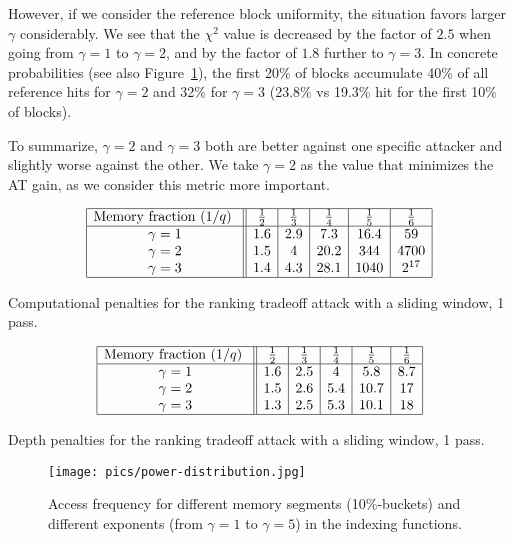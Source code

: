 \documentclass[a4paper]{article}
\begin{document}
However, if we consider the reference block uniformity, the situation favors larger $\gamma$ considerably. We see that the $\chi^2$ value is decreased by the factor of $2.5$ when going from $\gamma=1$ to $\gamma=2$, and by the factor of $1.8$ further to $\gamma=3$. In concrete probabilities (see also Figure~\ref{fig:histo}),
the first 20\% of blocks accumulate 40\% of all reference hits for $\gamma=2$ and 32\% for $\gamma=3$ (23.8\% vs  19.3\% hit for the first 10\% of blocks). 

To summarize, $\gamma=2$ and $\gamma=3$ both are better against one specific attacker and slightly worse against the other. We take $\gamma=2$ as the value that minimizes the AT gain, as we consider this metric more important. 

 \begin{table}[ht]
\renewcommand{\arraystretch}{1.3}
$$
\begin{array}{|c||c|c|c|c|c|}
\hline
\text{Memory fraction ($1/q$) } &\frac{1}{2} &\frac{1}{3} &\frac{1}{4}&\frac{1}{5} &\frac{1}{6}\\
\hline
\gamma=1 & 1.6 & 2.9 & 7.3 & 16.4 & 59\\
\gamma=2 & 1.5 & 4 & 20.2 & 344 & 4700\\
\gamma=3 &1.4& 4.3& 28.1 &1040 & 2^{17}\\
\hline
\end{array}
$$
\caption{Computational penalties for the ranking tradeoff attack with a sliding window, 1 pass.}\label{tab:comp-alpha}
\end{table}

 \begin{table}[ht]
\renewcommand{\arraystretch}{1.3}
$$
\begin{array}{|c||c|c|c|c|c|}
\hline
\text{Memory fraction ($1/q$) } &\frac{1}{2} &\frac{1}{3} &\frac{1}{4}&\frac{1}{5} &\frac{1}{6}\\
\hline
\gamma=1 & 1.6 & 2.5 & 4 & 5.8 & 8.7\\
\gamma=2 & 1.5 & 2.6 & 5.4 & 10.7 & 17\\
\gamma=3 &1.3& 2.5& 5.3 &10.1 & 18\\
\hline
\end{array}
$$
\caption{Depth penalties for the ranking tradeoff attack with a sliding window, 1 pass.}\label{tab:depth-alpha}
\end{table}

\begin{figure}[hb]
\begin{center}
\texttt{[image: pics/power-distribution.jpg]}
\end{center}
\caption{Access frequency for different memory segments (10\%-buckets) and different exponents (from $\gamma=1$ to $\gamma=5$) in the indexing functions.}\label{fig:histo}
\end{figure}
\end{document}
